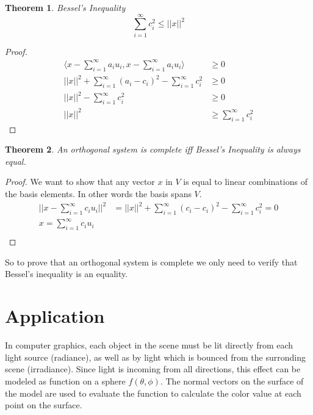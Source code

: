 \documentclass{article}
\newtheorem{theorem}{Theorem}
\theoremstyle{definition}
\theoremstyle{definition}
\begin{document}
\begin{theorem}
    Bessel's Inequality
    $$\sum_{i=1}^{\infty}c_{i}^{2} \leq ||x||^{2}$$
\end{theorem}

\begin{proof}
    \begin{equation}
    \begin{split}
        \langle x - \sum_{i=1}^{\infty} a_{i}u_{i}, x - \sum_{i=1}^{\infty} a_{i}u_{i} \rangle &\geq 0 \\
        ||x||^{2} + \sum_{i=1}^{\infty} (a_{i} - c_{i})^{2} - \sum_{i=1}^{\infty} c_{i}^{2} &\geq 0 \\
        ||x||^{2} - \sum_{i=1}^{\infty} c_{i}^{2} &\geq 0 \\
        ||x||^{2} &\geq \sum_{i=1}^{\infty} c_{i}^{2}
    \end{split}
    \end{equation} 
\end{proof}


\begin{theorem}
    An orthogonal system is complete iff Bessel's Inequality is always equal.
\end{theorem}

\begin{proof}
    We want to show that any vector $x$ in $V$ is equal to linear combinations of the basis elements. In other words the basis spans $V$.
    \begin{equation}
    \begin{split}
        ||x - \sum_{i=1}^{\infty} c_{i}u_{i}||^{2}&=||x||^{2} + \sum_{i=1}^{\infty} (c_{i} - c_{i})^{2} - \sum_{i=1}^{\infty} c_{i}^{2} = 0 \\
        x=\sum_{i=1}^{\infty} c_{i}u_{i} \\
    \end{split}
    \end{equation}
\end{proof}

So to prove that an orthogonal system is complete we only need to verify that Bessel's inequality is an equality.

\section{Application}
In computer graphics, each object in the scene must be lit directly from each light source (radiance), as well as by light which is bounced from the surronding scene (irradiance). Since light is incoming from all directions, this effect can be modeled as function on a sphere $f(\theta, \phi)$. The normal vectors on the surface of the model are used to evaluate the function to calculate the color value at each point on the surface.
\end{document}
